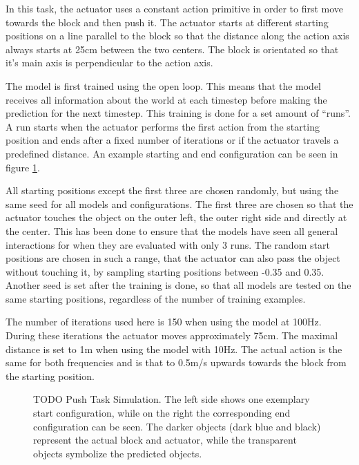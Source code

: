 In this task, the actuator uses a constant action primitive in order to first move towards the block and then push it.
The actuator starts at different starting positions on a line parallel to the block so that the distance along
the action axis always starts at 25cm between the two centers. The block is orientated so that it's main axis
is perpendicular to the action axis.

The model is first trained using the open loop. This means that the model receives all information about the
world at each timestep before making the prediction for the next timestep. This training is done for a set amount
of \enquote{runs}. A run starts when the actuator performs the first action from the starting position and ends after a fixed 
number of iterations or if the actuator travels a predefined distance.
An example starting and end configuration can be seen in figure \ref{fig:pushTaskSim}. 

All starting positions except the first three are chosen randomly, but using the
same seed for all models and configurations. %
The first three are chosen so that the actuator touches the object on the outer left, the outer right side
and directly at the center. This has been done to ensure that the models have seen all general interactions for when they are evaluated with only 3
runs. The random start positions are chosen in such a range, that the actuator can also pass the object without touching it, by sampling starting positions
between -0.35 and 0.35. Another seed is set after the training is done, so that all models are tested on the same starting positions, regardless of
the number of training examples.

The number of iterations used here is 150 when using
the model at 100Hz. During these iterations the actuator moves approximately 75cm. The maximal distance is set to 1m when using the
model with 10Hz. The actual action is the same for both frequencies and is that to 0.5m/s upwards towards the block from the starting
position. 

\begin{figure}
	
	\caption{TODO Push Task Simulation. The left side shows one exemplary start configuration, while on the right the corresponding end configuration can be seen.
		The darker objects (dark blue and black) represent the actual block and actuator, while the transparent objects symbolize the predicted objects.}
	\label{fig:pushTaskSim}
\end{figure}


